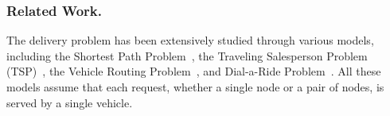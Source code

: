 
\subsubsection*{Related Work.}
 The delivery problem has been extensively studied through various models, including the Shortest Path Problem~\cite{ortega2022shortest}, the Traveling Salesperson Problem (TSP)~\cite{gutin2006traveling}, the Vehicle Routing Problem~\cite{toth2002vehicle},
 and Dial-a-Ride Problem~\cite{cordeau2007dial}.
All these models assume that each request, whether a single node or a pair of nodes, is served by a single vehicle. 
 
